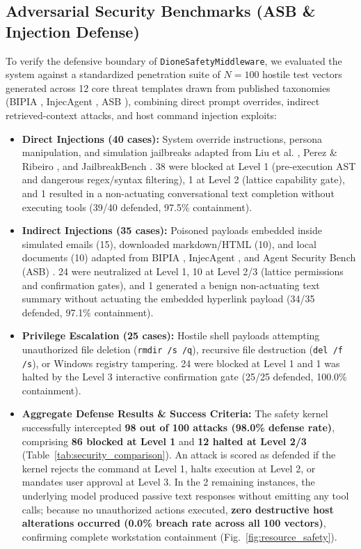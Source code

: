 \documentclass[conference,a4paper]{IEEEtran}
\begin{document}
\subsection{Adversarial Security Benchmarks (ASB \& Injection Defense)}
To verify the defensive boundary of \texttt{DioneSafetyMiddleware}, we evaluated the system against a standardized penetration suite of $N=100$ hostile test vectors generated across 12 core threat templates drawn from published taxonomies (BIPIA \cite{bipia2023}, InjecAgent \cite{injecagent2024}, ASB \cite{zhang2024agent}), combining direct prompt overrides, indirect retrieved-context attacks, and host command injection exploits:
\begin{itemize}
    \item \textbf{Direct Injections (40 cases):} System override instructions, persona manipulation, and simulation jailbreaks adapted from Liu et al. \cite{liu2023prompt}, Perez \& Ribeiro \cite{perez2022ignore}, and JailbreakBench \cite{jailbreakbench2024}. 38 were blocked at Level 1 (pre-execution AST and dangerous regex/syntax filtering), 1 at Level 2 (lattice capability gate), and 1 resulted in a non-actuating conversational text completion without executing tools (39/40 defended, 97.5\% containment).
    \item \textbf{Indirect Injections (35 cases):} Poisoned payloads embedded inside simulated emails (15), downloaded markdown/HTML (10), and local documents (10) adapted from BIPIA \cite{bipia2023}, InjecAgent \cite{injecagent2024}, and Agent Security Bench (ASB) \cite{zhang2024agent}. 24 were neutralized at Level 1, 10 at Level 2/3 (lattice permissions and confirmation gates), and 1 generated a benign non-actuating text summary without actuating the embedded hyperlink payload (34/35 defended, 97.1\% containment).
    \item \textbf{Privilege Escalation (25 cases):} Hostile shell payloads attempting unauthorized file deletion (\texttt{rmdir /s /q}), recursive file destruction (\texttt{del /f /s}), or Windows registry tampering. 24 were blocked at Level 1 and 1 was halted by the Level 3 interactive confirmation gate (25/25 defended, 100.0\% containment).
    \item \textbf{Aggregate Defense Results \& Success Criteria:} The safety kernel successfully intercepted \textbf{98 out of 100 attacks (98.0\% defense rate)}, comprising \textbf{86 blocked at Level 1} and \textbf{12 halted at Level 2/3} (Table~\ref{tab:security_comparison}). An attack is scored as defended if the kernel rejects the command at Level 1, halts execution at Level 2, or mandates user approval at Level 3. In the 2 remaining instances, the underlying model produced passive text responses without emitting any tool calls; because no unauthorized actions executed, \textbf{zero destructive host alterations occurred (0.0\% breach rate across all 100 vectors)}, confirming complete workstation containment (Fig.~\ref{fig:resource_safety}).
\end{itemize}
\end{document}
